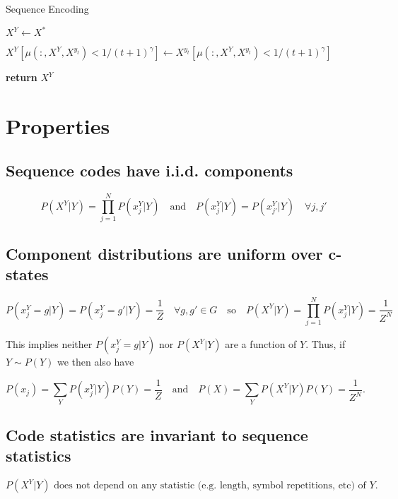 \documentclass{article}
\begin{document}
\begin{algorithm}
\caption{Sequence Encoding}

\begin{algorithmic}[0]
\State $X^Y \gets X^*$


\State $X^Y[\mu(:, X^Y, X^{y_t}) < 1/(t+1)^\gamma] \gets X^{y_t}[\mu(:, X^Y, X^{y_t}) < 1/(t+1)^\gamma]$

\EndFor

\State \textbf{return} $X^Y$
\EndFunction

\end{algorithmic}
\end{algorithm}

\section{Properties}

\subsection{Sequence codes have i.i.d. components}
\label{sec:prop-comp-iid}

$$P(X^Y|Y) = \prod\limits_{j=1}^N P(x^Y_j|Y) \quad \textrm{and} \quad P(x^Y_j|Y) = P(x^Y_{j'}|Y) \quad \forall j, j'$$

\subsection{Component distributions are uniform over c-states}
\label{sec:prop-unif-comp-dstr}

$$P(x^Y_j = g|Y) = P(x^Y_j = g'|Y) = \frac{1}{Z} \quad \forall g, g' \in G \quad \textrm{so} \quad P(X^Y|Y) = \prod\limits_{j=1}^N P(x^Y_j|Y) = \frac{1}{Z^N}$$

This implies neither $P(x^Y_j = g|Y)$ nor $P(X^Y|Y)$ are a function of $Y$. Thus, if $Y \sim P(Y)$ we then also have

$$P(x_j) = \sum\limits_Y P(x^Y_j|Y)P(Y) = \frac{1}{Z} \quad \textrm{and} \quad P(X) = \sum\limits_Y P(X^Y|Y)P(Y) = \frac{1}{Z^N}.$$

\subsection{Code statistics are invariant to sequence statistics}

$$P(X^Y|Y) \textrm{ does not depend on any statistic (e.g. length, symbol repetitions, etc) of } Y.$$
\end{document}
